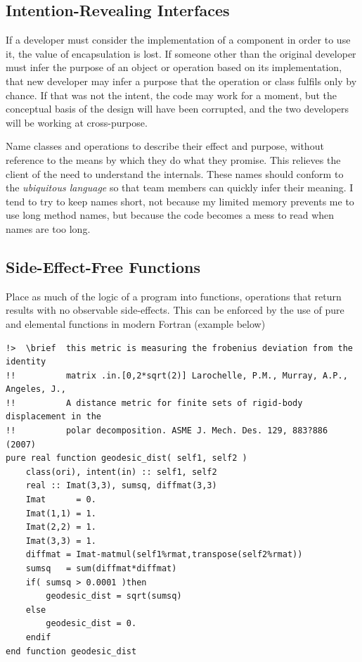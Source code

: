 \documentclass[a4paper,11pt]{article}
\begin{document}
\subsection{Intention-Revealing Interfaces}
If a developer must consider the implementation of a component in order to use it, the value of encapsulation is lost. If someone other than the original developer must infer the purpose of an object or operation based on its implementation, that new developer may infer a purpose that the operation or class fulfils only by chance. If that was not the intent, the code may work for a moment, but the conceptual basis of the design will have been corrupted, and the two developers will be working at cross-purpose.

Name classes and operations to describe their effect and purpose, without reference to the means by which they do what they promise. This relieves the client of the need to understand the internals. These names should conform to the \textit{ubiquitous language} so that team members can quickly infer their meaning. I tend to try to keep names short, not because my limited memory prevents me to use long method names, but because the code becomes a mess to read when names are too long.

\subsection{Side-Effect-Free Functions}
Place as much of the logic of a program into functions, operations that return results with no observable side-effects. This can be enforced by the use of pure and elemental functions in modern Fortran (example below)

\begin{verbatim}
!>  \brief  this metric is measuring the frobenius deviation from the identity
!!          matrix .in.[0,2*sqrt(2)] Larochelle, P.M., Murray, A.P., Angeles, J., 
!!          A distance metric for finite sets of rigid-body displacement in the 
!!          polar decomposition. ASME J. Mech. Des. 129, 883?886 (2007)
pure real function geodesic_dist( self1, self2 )
    class(ori), intent(in) :: self1, self2
    real :: Imat(3,3), sumsq, diffmat(3,3)
    Imat      = 0.
    Imat(1,1) = 1.
    Imat(2,2) = 1.
    Imat(3,3) = 1.
    diffmat = Imat-matmul(self1%rmat,transpose(self2%rmat))
    sumsq   = sum(diffmat*diffmat)
    if( sumsq > 0.0001 )then
        geodesic_dist = sqrt(sumsq)
    else
        geodesic_dist = 0.
    endif
end function geodesic_dist
\end{verbatim}
\end{document}
